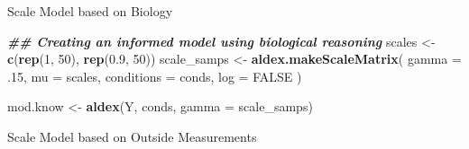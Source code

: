 \documentclass[
  ignorenonframetext,
]{beamer}
\newenvironment{Shaded}{\begin{snugshade}}{\end{snugshade}}
\newcommand{\AttributeTok}[1]{\textcolor[rgb]{0.13,0.29,0.53}{#1}}
\newcommand{\ConstantTok}[1]{\textcolor[rgb]{0.56,0.35,0.01}{#1}}
\newcommand{\ControlFlowTok}[1]{\textcolor[rgb]{0.13,0.29,0.53}{\textbf{#1}}}
\newcommand{\DecValTok}[1]{\textcolor[rgb]{0.00,0.00,0.81}{#1}}
\newcommand{\DocumentationTok}[1]{\textcolor[rgb]{0.56,0.35,0.01}{\textbf{\textit{#1}}}}
\newcommand{\FloatTok}[1]{\textcolor[rgb]{0.00,0.00,0.81}{#1}}
\newcommand{\FunctionTok}[1]{\textcolor[rgb]{0.13,0.29,0.53}{\textbf{#1}}}
\newcommand{\NormalTok}[1]{#1}
\newcommand{\OtherTok}[1]{\textcolor[rgb]{0.56,0.35,0.01}{#1}}
\newcommand{\SpecialCharTok}[1]{\textcolor[rgb]{0.81,0.36,0.00}{\textbf{#1}}}
\begin{document}
\begin{frame}[fragile]{Scale Model based on Biology}
\protect\hypertarget{scale-model-based-on-biology}{}
\begin{Shaded}
\begin{Highlighting}[]
\DocumentationTok{\#\# Creating an informed model using biological reasoning}
\NormalTok{scales }\OtherTok{\textless{}{-}} \FunctionTok{c}\NormalTok{(}\FunctionTok{rep}\NormalTok{(}\DecValTok{1}\NormalTok{, }\DecValTok{50}\NormalTok{), }\FunctionTok{rep}\NormalTok{(}\FloatTok{0.9}\NormalTok{, }\DecValTok{50}\NormalTok{))}
\NormalTok{scale\_samps }\OtherTok{\textless{}{-}} \FunctionTok{aldex.makeScaleMatrix}\NormalTok{(}
  \AttributeTok{gamma =}\NormalTok{ .}\DecValTok{15}\NormalTok{,}
  \AttributeTok{mu =}\NormalTok{ scales,}
  \AttributeTok{conditions =}\NormalTok{ conds,}
  \AttributeTok{log =} \ConstantTok{FALSE}
\NormalTok{)}

\NormalTok{mod.know }\OtherTok{\textless{}{-}} \FunctionTok{aldex}\NormalTok{(Y, conds, }\AttributeTok{gamma =}\NormalTok{ scale\_samps)}
\end{Highlighting}
\end{Shaded}
\end{frame}

\begin{frame}[fragile]{Scale Model based on Outside Measurements}
\protect\hypertarget{scale-model-based-on-outside-measurements}{}
\begin{Shaded}
\end{Shaded}
\end{frame}
\end{document}
